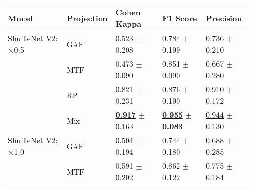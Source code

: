 
\begin{tabular}[t]{lllll}
\toprule
Model & Projection & Cohen Kappa & F1 Score & Precision \\
\midrule
ShuffleNet V2: $\times$0.5 & GAF & \textcolor[rgb]{0.8873720137,0.1126279863,0}{0.523} $\pm$ \textcolor[rgb]{0.8343759381,0.1656240619,0}{0.208} & \textcolor[rgb]{0.6687402799,0.3312597201,0}{0.784} $\pm$ \textcolor[rgb]{0.7892330506,0.2107669494,0}{0.199} & \textcolor[rgb]{0.6673189824,0.3326810176,0}{0.736} $\pm$ \textcolor[rgb]{0.3897371717,0.5000000000,0}{0.210} \\
 & MTF & \textcolor[rgb]{1.0000000000,0.0000000000,0}{0.473} $\pm$ \textcolor[rgb]{0.3631919561,0.5000000000,0}{0.090} & \textcolor[rgb]{0.4059097978,0.5000000000,0}{0.851} $\pm$ \textcolor[rgb]{0.0459000684,0.5000000000,0}{0.090} & \textcolor[rgb]{0.8825831703,0.1174168297,0}{0.667} $\pm$ \textcolor[rgb]{0.6766436317,0.3233563683,0}{0.280} \\
 & RP & \textcolor[rgb]{0.2158703072,0.5000000000,0}{0.821} $\pm$ \textcolor[rgb]{0.9277733337,0.0722266663,0}{0.231} & \textcolor[rgb]{0.3079315708,0.5000000000,0}{0.876} $\pm$ \textcolor[rgb]{0.7294240912,0.2705759088,0}{0.190} & \underline{\textcolor[rgb]{0.1291585127,0.5000000000,0}{0.910}} $\pm$ \textcolor[rgb]{0.2351015167,0.5000000000,0}{0.172} \\
 & Mix & \underline{\textbf{\textcolor[rgb]{0.0000000000,0.5000000000,0}{0.917}}} $\pm$ \textcolor[rgb]{0.6538202475,0.3461797525,0}{0.163} & \underline{\textbf{\textcolor[rgb]{0.0000000000,0.5000000000,0}{0.955}}} $\pm$ \textbf{\textcolor[rgb]{0.0000000000,0.5000000000,0}{0.083}} & \underline{\textcolor[rgb]{0.0215264188,0.5000000000,0}{0.944}} $\pm$ \textcolor[rgb]{0.0609939296,0.5000000000,0}{0.130} \\
ShuffleNet V2: $\times$1.0 & GAF & \textcolor[rgb]{0.9291808874,0.0708191126,0}{0.504} $\pm$ \textcolor[rgb]{0.7773511492,0.2226488508,0}{0.194} & \textcolor[rgb]{0.8253923371,0.1746076629,0}{0.744} $\pm$ \textcolor[rgb]{0.6641345574,0.3358654426,0}{0.180} & \textcolor[rgb]{0.8180039139,0.1819960861,0}{0.688} $\pm$ \textcolor[rgb]{0.6973487950,0.3026512050,0}{0.285} \\
 & MTF & \textcolor[rgb]{0.7337883959,0.2662116041,0}{0.591} $\pm$ \textcolor[rgb]{0.8121219026,0.1878780974,0}{0.202} & \textcolor[rgb]{0.3639191291,0.5000000000,0}{0.862} $\pm$ \textcolor[rgb]{0.2646008883,0.5000000000,0}{0.122} & \textcolor[rgb]{0.5467710372,0.4532289628,0}{0.775} $\pm$ \textcolor[rgb]{0.2859299411,0.5000000000,0}{0.184} \\

\end{tabular}
